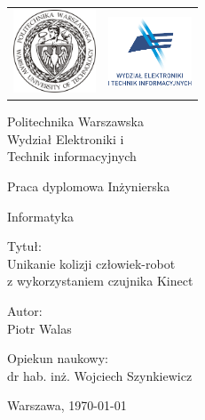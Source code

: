 \begin{titlepage}
\pagestyle{empty}

\noindent
\begin{large}
\begin{table}[t]
\centering
\setlength{\tabcolsep}{40pt}
\begin{tabular}[t]{lr}
 \includegraphics[width=70pt,height=70pt]{gfx/pw_logo.jpg} & \includegraphics[width=70pt,height=70pt]{gfx/weiti_logo.pdf}
\end{tabular}
\end{table}

\begin{center}Politechnika Warszawska \\
Wydział Elektroniki i \\
Technik informacyjnych\end{center}

\vfill

\begin{center}Praca dyplomowa Inżynierska\end{center}
\begin{center}Informatyka\end{center}

\end{large}

\vfill
\begin{center}
\Large
Tytuł: \\
\Huge
Unikanie kolizji człowiek-robot \\
z wykorzystaniem czujnika Kinect
\end{center}

\vfill
\begin{center}
\large
Autor: \\
\Large
Piotr Walas
\end{center}

\vfill
\begin{center}
\large
Opiekun naukowy: \\
\Large
dr hab. inż. Wojciech Szynkiewicz
\end{center}

\vfill
\begin{center}
Warszawa, \today
\end{center}

\end{titlepage}